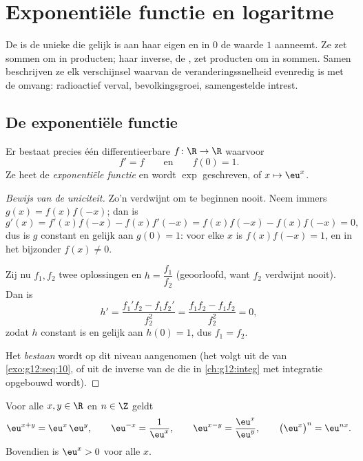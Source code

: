 \chapter{Exponentiële functie en logaritme}\label{ch:g12:exp}

De  is de unieke  die gelijk is aan haar eigen
 en in $0$ de waarde $1$ aanneemt. Ze zet sommen om in producten;
haar inverse, de , zet producten om in sommen. Samen
beschrijven ze elk verschijnsel waarvan de veranderingssnelheid evenredig is
met de omvang: radioactief verval, bevolkingsgroei, samengestelde intrest.

\section{De exponentiële functie}

\begin{theorem}\label{thm:g12:exp:existence}
Er bestaat precies één differentieerbare  $f \colon \R \to \R$ waarvoor
\[
f' = f \qquad\text{en}\qquad f(0) = 1 .
\]
Ze heet de \emph{exponentiële functie} en wordt
$\exp$ geschreven, of $x \mapsto \eu^x$.
\end{theorem}

\begin{proof}[Bewijs van de uniciteit]
Zo'n  verdwijnt om te beginnen nooit. Neem immers
$g(x) = f(x)f(-x)$; dan is
\[
g'(x) = f'(x)f(-x) - f(x)f'(-x) = f(x)f(-x) - f(x)f(-x) = 0,
\]
dus is $g$ constant en gelijk aan $g(0) = 1$: voor elke $x$ is
$f(x)f(-x) = 1$, en in het bijzonder $f(x) \neq 0$.

Zij nu $f_1, f_2$ twee oplossingen en $h = \dfrac{f_1}{f_2}$ (geoorloofd,
want $f_2$ verdwijnt nooit). Dan is
\[
h' = \frac{f_1' f_2 - f_1 f_2'}{f_2^2} = \frac{f_1 f_2 - f_1 f_2}{f_2^2} = 0,
\]
zodat $h$ constant is en gelijk aan $h(0) = 1$, dus $f_1 = f_2$.

Het \emph{bestaan} wordt op dit niveau aangenomen (het volgt uit de  van
\cref{exo:g12:seq:10}, of uit de inverse van de  die in
\cref{ch:g12:integ} met integratie opgebouwd wordt).
\end{proof}

\begin{proposition}[Functionaalvergelijking]\label{prop:g12:exp:funceq}
Voor alle $x, y \in \R$ en $n \in \Z$ geldt
\[
\eu^{x+y} = \eu^x\,\eu^y, \qquad
\eu^{-x} = \frac{1}{\eu^x}, \qquad
\eu^{x-y} = \frac{\eu^x}{\eu^y}, \qquad
\bigl(\eu^{x}\bigr)^n = \eu^{nx}.
\]
Bovendien is $\eu^x > 0$ voor alle $x$.
\end{proposition}

